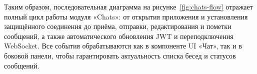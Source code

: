 Таким образом, последовательная диаграмма на рисунке~\ref{fig:chats-flow} отражает полный цикл работы модуля «Chats»: от открытия приложения и установления защищённого соединения до приёма, отправки, редактирования и пометки сообщений, а также автоматического обновления JWT и переподключения WebSocket. Все события обрабатываются как в компоненте UI «Чат», так и в боковой панели, чтобы гарантировать актуальность списка бесед и статусов сообщений.
